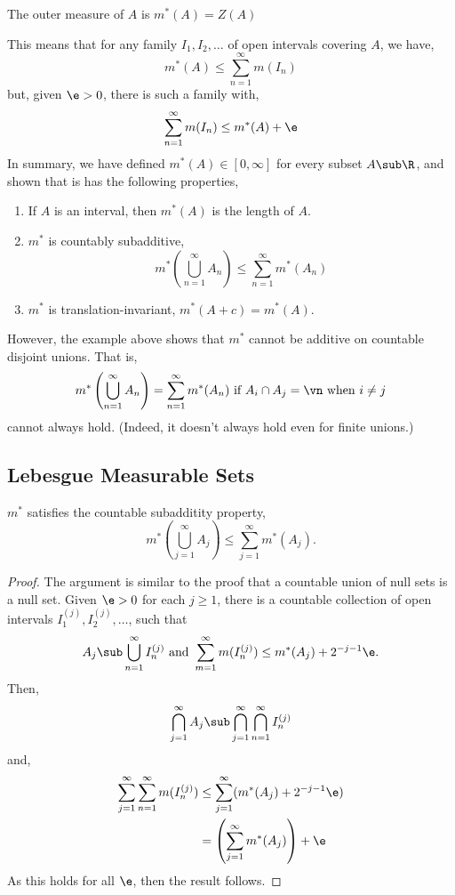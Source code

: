 \begin{ndefi}
  The outer measure of $A$ is $m^*(A) = Z(A)$
\end{ndefi}

\noindent
This means that for any family $I_1, I_2, \dots$ of open intervals covering $A$, we have,
$$ m^*(A) \le \sum_{n=1}^\infty m(I_n) $$
but, given $\e > 0$, there is such a family with,
$$ \sum_{n=1}^\infty m(I_n) \le m^*(A) + \e $$
In summary, we have defined $m^*(A) \in [0, \infty]$ for every subset $A \sub \R$, and shown that is has the following properties,
\begin{enumerate}
  \item If $A$ is an interval, then $m^*(A)$ is the length of $A$.
  \item $m^*$ is countably subadditive,
  $$ m^*\left( \bigcup_{n=1}^\infty A_n \right) \le \sum_{n=1}^\infty m^*(A_n) $$
  \item $m^*$ is translation-invariant, $m^*(A + c) = m^*(A)$.
\end{enumerate}

\noindent
However, the example above shows that $m^*$ cannot be additive on countable disjoint unions. That is,
$$ m^*\left( \bigcup_{n=1}^\infty A_n \right) = \sum_{n=1}^\infty m^*(A_n) \text{ if } A_i \cap A_j = \vn \text{ when } i \ne j $$
cannot always hold. (Indeed, it doesn't always hold even for finite unions.)


\subsection{Lebesgue Measurable Sets}
\begin{nthm}[]
  $m^*$ satisfies the countable subadditity property,
  $$ m^*\left( \bigcup_{j=1}^\infty A_j \right) \le \sum_{j=1}^\infty m^*(A_j). $$
\end{nthm}
\begin{proof}
  The argument is similar to the proof that a countable union of null sets is a null set. Given $\e > 0$ for each $j \ge 1$, there is a countable collection of open intervals $I_1^{(j)}, I_2^{(j)}, \dots$, such that
  $$ A_j \sub \bigcup_{n=1}^\infty I_n^{(j)} \text{ and } \sum_{m=1}^\infty m(I_n^{(j)}) \le m^*(A_j) + 2^{-j-1}\e.$$
  Then,
  $$ \bigcap_{j=1}^\infty A_j \sub \bigcap_{j=1}^\infty \bigcap_{n=1}^\infty I_n^{(j)} $$
  and,
  \begin{align*}
    \sum_{j=1}^\infty \sum_{n=1}^\infty m(I_n^{(j)}) &\le \sum_{j=1}^{\infty} (m^*(A_j) + 2^{-j-1}\e)\\
    &= \left( \sum_{j=1}^\infty m^*(A_j) \right) + \e \\
  \end{align*}
  As this holds for all $\e$, then the result follows.
\end{proof}

